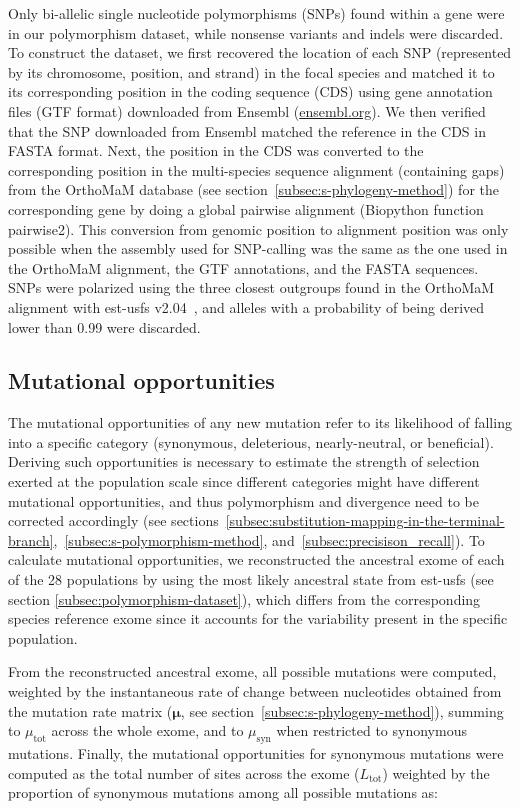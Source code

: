 \documentclass{article}
\newcommand{\UniDimArray}[1]{\bm{#1}}
\begin{document}
    Only bi-allelic single nucleotide polymorphisms (SNPs) found within a gene were in our polymorphism dataset, while nonsense variants and indels were discarded.
    To construct the dataset, we first recovered the location of each SNP (represented by its chromosome, position, and strand) in the focal species and matched it to its corresponding position in the coding sequence (CDS) using gene annotation files (GTF format) downloaded from Ensembl (\url{ensembl.org}).
    We then verified that the SNP downloaded from Ensembl matched the reference in the CDS in FASTA format.
    Next, the position in the CDS was converted to the corresponding position in the multi-species sequence alignment (containing gaps) from the OrthoMaM database (see section~\ref{subsec:s-phylogeny-method}) for the corresponding gene by doing a global pairwise alignment (Biopython function pairwise2).
    This conversion from genomic position to alignment position was only possible when the assembly used for SNP-calling was the same as the one used in the OrthoMaM alignment, the GTF annotations, and the FASTA sequences.
    SNPs were polarized using the three closest outgroups found in the OrthoMaM alignment with est-usfs v2.04~\cite{keightley_inferring_2018}, and alleles with a probability of being derived lower than 0.99 were discarded.

    \subsection{Mutational opportunities}
    \label{subsec:nunber-of-sites}
    The mutational opportunities of any new mutation refer to its likelihood of falling into a specific category (synonymous, deleterious, nearly-neutral, or beneficial).
    Deriving such opportunities is necessary to estimate the strength of selection exerted at the population scale since different categories might have different mutational opportunities, and thus polymorphism and divergence need to be corrected accordingly (see sections~\ref{subsec:substitution-mapping-in-the-terminal-branch},~\ref{subsec:s-polymorphism-method}, and~\ref{subsec:precisison_recall}).
    To calculate mutational opportunities, we reconstructed the ancestral exome of each of the 28 populations by using the most likely ancestral state from est-usfs (see section \ref{subsec:polymorphism-dataset}), which differs from the corresponding species reference exome since it accounts for the variability present in the specific population.

    From the reconstructed ancestral exome, all possible mutations were computed, weighted by the instantaneous rate of change between nucleotides obtained from the mutation rate matrix ($\UniDimArray{\mu}$, see section~\ref{subsec:s-phylogeny-method}), summing to $\mu_{\text{tot}}$ across the whole exome, and to $\mu_{\text{syn}}$ when restricted to synonymous mutations.
    Finally, the mutational opportunities for synonymous mutations were computed as the total number of sites across the exome ($L_{\text{tot}}$) weighted by the proportion of synonymous mutations among all possible mutations as:
\end{document}

